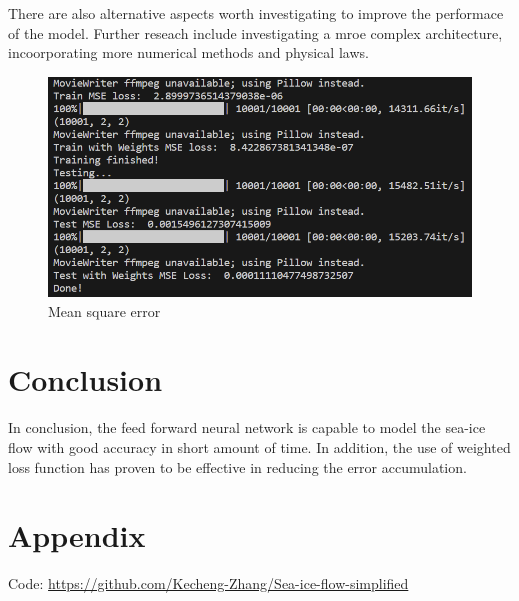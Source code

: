 \documentclass[12pt, a4paper]{article}
\begin{document}
There are also alternative aspects worth investigating to improve the performace of the model. Further reseach include investigating a mroe complex architecture, incoorporating more numerical methods and physical laws.

\begin{figure}
    \centering
    \includegraphics[scale=0.8]{../mse.png}
    \caption[]{Mean square error}
    \label{fig:mse}
\end{figure}

\section{Conclusion}
In conclusion, the feed forward neural network is capable to model the sea-ice flow with good accuracy in short amount of time. In addition, the use of weighted loss function has proven to be effective in reducing the error accumulation.

\newpage
\section{Appendix}
Code: 
\href{https://github.com/Kecheng-Zhang/Sea-ice-flow-simplified}{https://github.com/Kecheng-Zhang/Sea-ice-flow-simplified}
\end{document}

